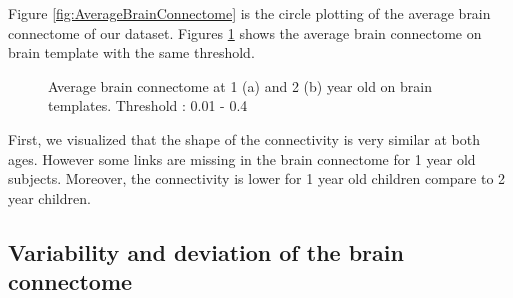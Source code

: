 \documentclass[]{spie}  %
\begin{document}
Figure \ref{fig:AverageBrainConnectome} is the circle plotting of the average brain connectome of our dataset. Figures \ref{fig:AverageBrainConnectomeBrainTemplate} shows the average brain connectome on brain template with the same threshold.

\begin{figure}
\centering 
{}
\caption[Average brain connectome at 1 (a) and 2 (b) year old on brain templates ]{Average brain connectome at 1 (a) and 2 (b) year old on brain templates. Threshold : 0.01 - 0.4}
\label{fig:AverageBrainConnectomeBrainTemplate}
\end{figure} 

First, we visualized that the shape of the connectivity is very similar at both ages. However some links are missing in the brain connectome for 1 year old subjects. Moreover, the connectivity is lower for 1 year old children compare to 2 year children.


\subsection{Variability and deviation of the brain connectome}
\end{document}

